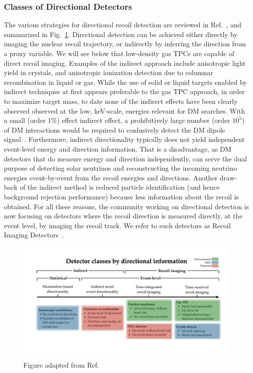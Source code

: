 
\subsubsection{Classes of Directional Detectors}
  
The various strategies for directional recoil detection are reviewed in Ref.~\cite{Vahsen:2021gnb}, and summarized in Fig.~\ref{directional_classification}. Directional detection can be achieved either directly by imaging the nuclear recoil trajectory, or indirectly by inferring the direction from a proxy variable. We will see below that low-density gas TPCs are capable of direct recoil imaging. Examples of the indirect approach include anisotropic light yield in crystals, and anisotropic ionization detection due to columnar recombination in liquid or gas. While the use of solid or liquid targets enabled by indirect techniques at first appears preferable to the gas TPC approach, in order to maximize target mass, to date none of the indirect effects have been clearly observed observed at the low, keV-scale, energies relevant for DM searches.  With a small (order 1\%) effect indirect effect, a prohibitively large number (order $10^5$) of DM interactions would be required to conlusively detect the DM dipole signal~\cite{Vahsen:2021gnb, OHare:2020lva}. Furthermore, indirect directionality typically does not yield independent event-level energy and direction information. That is a disadvantage, as DM detectors that do measure energy and direction independently, can serve the dual purpose of detecting solar neutrinos and reconstructing the incoming neutrino energies event-by-event from the recoil energies and directions. Another draw-back of the indirect method is reduced particle identification (and hence background rejection performance) because less information about the recoil is obtained. For all these reasons, the community working on directional detection is now focusing on detectors where the recoil direction is measured directly, at the event level, by imaging the recoil track. We refer to such detectors as Recoil Imaging Detectors~\cite{SnowmassIF53}.


\begin{figure}[!htbp]
\begin{center}
\includegraphics[width=0.99\columnwidth]{figures/DetectorClassTableAR.pdf}
\caption{ Figure adapted from Ref.~\cite{Vahsen:2021gnb}}\label{directional_classification}
\end{center}
\end{figure}


